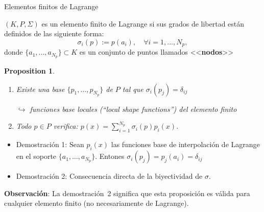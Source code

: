 \documentclass[9pt,leqno]{beamer}
\newcommand{\Np}{{N_p}}
\newtheorem{proposition}{Proposition}
\begin{document}
\begin{frame}{Elementos finitos de Lagrange}

  \begin{definition} $(K,P,\Sigma)$ es un \alert{elemento finito de
      Lagrange} si sus grados de libertad están definidos de las siguiente
    forma:
    $$
    \sigma_i(p) := p(a_i), \quad \forall i=1,...,\Np,
    $$
    donde $\{a_1,...,a_\Np\} \subset K$ es un conjunto de puntos
    llamados <<\textbf{nodos}>>
  \end{definition}

\begin{proposition}
  \begin{enumerate}
  \item Existe una base $\{p_1,...,p_\Np\}$ de $P$ tal que
    $\sigma_i(p_j)=\delta_{ij}$
    \begin{flushright} \scriptsize $\hookrightarrow$  \alert{funciones base} locales
      (``\textit{local shape functions}'') del elemento finito
    \end{flushright}
  \item Todo $p\in P$ verifica: $p(x)=\sum_{i=1}^\Np \sigma_i(p) p_i(x)$.
  \end{enumerate}
\end{proposition}

\begin{footnotesize}
  \begin{itemize}
  \item Demostración 1: Sean $p_i(x)$ las funciones base de
    interpolación de Lagrange en el soporte
    $\{a_1,\dots,a_\Np\}$. Entones
    $\sigma_i(p_j)=p_j(a_i)=\delta_{ij}$
  \item Demostración 2: Consecuencia directa de la biyectividad de $\sigma$.
  \end{itemize}
\end{footnotesize}

  \textbf{Observación}: La demostración~2 significa que \alert{esta proposición es válida para
  cualquier elemento finito} (no necesariamente de Lagrange).
\end{frame}
\end{document}

